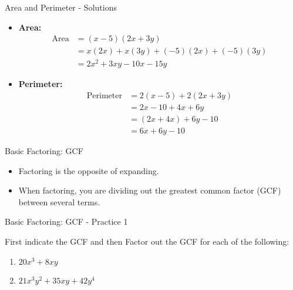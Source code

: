 \documentclass[aspectratio=169]{beamer}
\begin{document}
\begin{frame}{Area and Perimeter - Solutions}
    \begin{tcolorbox}[colback=lightgray,colframe=accent,title=Detailed Solutions]
        \footnotesize
        \begin{itemize}
            \item \textbf{Area:}
            \begin{align*}
                \text{Area} &= (x - 5)(2x + 3y) \\
                &= x(2x) + x(3y) + (-5)(2x) + (-5)(3y) \\
                &= 2x^2 + 3xy - 10x - 15y
            \end{align*}
            \item \textbf{Perimeter:}
            \begin{align*}
                \text{Perimeter} &= 2(x - 5) + 2(2x + 3y) \\
                &= 2x - 10 + 4x + 6y \\
                &= (2x + 4x) + 6y - 10 \\
                &= 6x + 6y - 10
            \end{align*}
        \end{itemize}
    \end{tcolorbox}
\end{frame}

\begin{frame}{Basic Factoring: GCF}
    \begin{tcolorbox}[colback=lightgray,colframe=primary,title=Introduction]
        \footnotesize
        \begin{itemize}
            \item Factoring is the opposite of expanding.
            \item When factoring, you are dividing out the greatest common factor (GCF) between several terms.
        \end{itemize}
    \end{tcolorbox}
\end{frame}

\begin{frame}{Basic Factoring: GCF - Practice 1}
    \begin{tcolorbox}[colback=lightgray,colframe=primary,title=Practice Problems]
        \footnotesize
        First indicate the GCF and then Factor out the GCF for each of the following:
        \begin{enumerate}
            \setlength{\itemsep}{0.5em}
            \item $20x^3 + 8xy$
            \item $21x^3y^2 + 35xy + 42y^4$
        \end{enumerate}
    \end{tcolorbox}
\end{frame}
\end{document}
